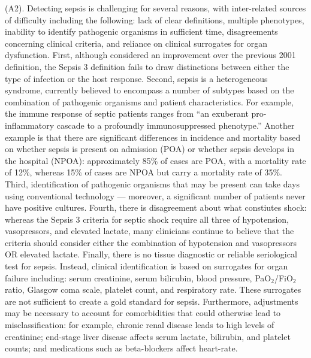 \documentclass{amia}
\begin{document}
	(A2).
        Detecting sepsis is challenging for several
	reasons, with inter-related sources of difficulty including
	the following: lack of clear definitions, multiple phenotypes,
	inability to identify pathogenic organisms in sufficient
	time, disagreements concerning clinical criteria, and
	reliance on clinical surrogates for organ dysfunction.
	 First, although considered an improvement over the previous
	2001 definition, the Sepsis 3 definition fails to draw
	distinctions between either the type of infection or the
	host response.\cite{coopersmith2018} 
	 Second, sepsis is a heterogeneous syndrome, currently believed to encompass a
	number of subtypes based on the combination of pathogenic
	organisms and patient characteristics.\cite{coopersmith2018}
	 For example, the immune response of septic patients ranges
	from ``an exuberant pro-inflammatory cascade to a profoundly
	immunosuppressed phenotype.''\cite{coopersmith2018}  
	 Another example is that there are significant differences in incidence
	and mortality based on whether sepsis is present on admission
	(POA) or whether sepsis develops in the hospital (NPOA):
	approximately 85\% of cases are POA, with a mortality rate
	of 12\%, whereas 15\% of cases are NPOA but carry a mortality
	rate of 35\%.\cite{rothman2017} 
	 Third, identification of pathogenic organisms that 
	may be present 	can take days using conventional technology --- moreover, 
	a significant number of patients never have positive cultures.\cite{coopersmith2018}  
	 Fourth, there is disagreement about what constiutes shock: whereas
	the Sepsis 3 criteria for septic shock require all three
	of hypotension, vasopressors, and elevated lactate, many
	clinicians continue to believe that the criteria should
	consider either the combination of hypotension and vasopressors
	OR elevated lactate.\cite{coopersmith2018}  
	 Finally, there is no tissue diagnostic or reliable seriological test for
	sepsis.\cite{macdonald2017}  
	 Instead, clinical identification is based on surrogates 
	for organ failure including: serum creatinine, serum bilirubin, 
	blood pressure, PaO$_2$/FiO$_2$ ratio, Glasgow coma scale, platelet count, 
	and respiratory rate.  
	 These surrogates are not sufficient to create a gold
	standard for sepsis.\cite{coopersmith2018}  
	 Furthermore, adjustments may be necessary to account for comorbidities
	that could otherwise lead to misclassification: for example,
	chronic renal disease leads to high levels of creatinine;
	end-stage liver disease affects serum lactate, bilirubin,
	and platelet counts; and medications such as beta-blockers
	affect heart-rate.\cite{manaktala2016}
\end{document}
